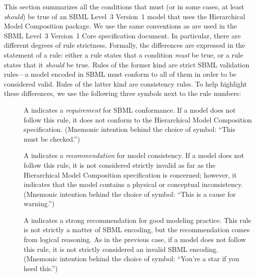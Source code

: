 This section summarizes all the conditions that must (or in some cases,
at least \emph{should}) be true of an SBML Level~3 Version~1 model that
uses the Hierarchical Model Composition package.  We use the same
conventions as are used in the SBML Level~3 Version~1 Core specification
document.  In particular, there are different degrees of rule
strictness.  Formally, the differences are expressed in the statement of
a rule: either a rule states that a condition \emph{must} be true, or a
rule states that it \emph{should} be true.  Rules of the former kind are
strict SBML validation rules---a model encoded in SBML must conform to
all of them in order to be considered valid.  Rules of the latter kind
are consistency rules.  To help highlight these differences, we use the
following three symbols next to the rule numbers:

\begin{description}

\item[\hspace*{6.5pt}\vSymbol\vsp] A \vSymbolName indicates a
  \emph{requirement} for SBML conformance. If a model does not follow
  this rule, it does not conform to the Hierarchical Model Composition
  specification.  (Mnemonic intention behind the choice of symbol:
  ``This must be checked.'')

\item[\hspace*{6.5pt}\cSymbol\csp] A \cSymbolName indicates a
  \emph{recommendation} for model consistency.  If a model does not
  follow this rule, it is not considered strictly invalid as far as
  the Hierarchical Model Composition specification is concerned;
  however, it indicates that the model contains a physical or
  conceptual inconsistency.  (Mnemonic intention behind the choice of
  symbol: ``This is a cause for warning.'')

\item[\hspace*{6.5pt}\mSymbol\msp] A \mSymbolName indicates a strong
  recommendation for good modeling practice.  This rule is not
  strictly a matter of SBML encoding, but the recommendation comes
  from logical reasoning.  As in the previous case, if a model does
  not follow this rule, it is not strictly considered an invalid SBML
  encoding.  (Mnemonic intention behind the choice of symbol: ``You're
  a star if you heed this.'')

\end{description}


